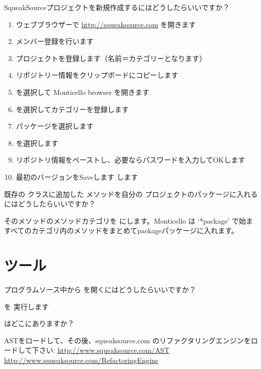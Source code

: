 \documentclass[a4paper,10pt,twoside]{book}
\begin{document}
\begin{faq}
SqueakSourceプロジェクトを新規作成するにはどうしたらいいですか？
\end{faq}
\answer
\begin{enumerate}
  \item ウェブブラウザーで \url{http://squeaksource.com} を開きます
  \item メンバー登録を行います
  \item プロジェクトを登録します（名前＝カテゴリーとなります）
  \item リポジトリー情報をクリップボードにコピーします
  \item {} を選択して Monticello browser を開きます
  \item {} を選択してカテゴリーを登録します
  \item パッケージを選択します
  \item {} を選択します
  \item リポジトリ情報をペーストし、必要ならパスワードを入力してOKします
  \item 最初のバージョンをSaveします  します
\end{enumerate}

\begin{faq}
既存の  クラスに追加した  メソッドを自分の  プロジェクトのパッケージに入れるにはどうしたらいいですか？
\end{faq}
\answer
そのメソッドのメソッドカテゴリを  にします。Monticello は ‘*package’ で始ますべてのカテゴリ内のメソッドをまとめてpackageパッケージに入れます。

\section{ツール}

\begin{faq}
プログラムソース中から   を開くにはどうしたらいいですか？
\end{faq}
\answer
  を 実行します

\begin{faq}
 はどこにありますか？ 
\end{faq}
\answer
ASTをロードして、その後、squeaksource.com のリファクタリングエンジンをロードして下さい:
\url{http://www.squeaksource.com/AST}
\url{http://www.squeaksource.com/RefactoringEngine}
\end{document}
